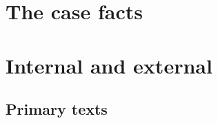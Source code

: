 \documentclass[11pt,hidelinks]{memoir}
\begin{document}
\part{The case facts}\label{part:case-facts}



\part{Internal and external}\label{part:variation}





\backmatter

\clearpage
\chapter*{Primary texts}
\begingroup
  \setlength{\LTleft}{-\tabcolsep}
\printacronyms[include=texts, heading=none]
\endgroup
{}

\newrefcontext[sorting=nyt]
\printbibliography

\end{document}
